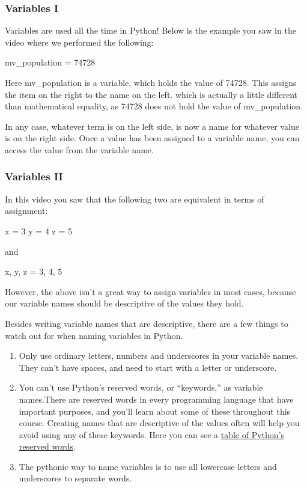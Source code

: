 \documentclass[11pt]{article}
\begin{document}
    \hypertarget{variables-i}{%
\subsubsection{Variables I}\label{variables-i}}

Variables are used all the time in Python! Below is the example you saw
in the video where we performed the following:

mv\_population = 74728

Here mv\_population is a variable, which holds the value of 74728. This
assigns the item on the right to the name on the left. which is actually
a little different than mathematical equality, as 74728 does not hold
the value of mv\_population.

In any case, whatever term is on the left side, is now a name for
whatever value is on the right side. Once a value has been assigned to a
variable name, you can access the value from the variable name.

    \hypertarget{variables-ii}{%
\subsubsection{Variables II}\label{variables-ii}}

In this video you saw that the following two are equivalent in terms of
assignment:

x = 3 y = 4 z = 5

and

x, y, z = 3, 4, 5

However, the above isn't a great way to assign variables in most cases,
because our variable names should be descriptive of the values they
hold.

Besides writing variable names that are descriptive, there are a few
things to watch out for when naming variables in Python.

\begin{enumerate}
\def\labelenumi{\arabic{enumi}.}
\item
  Only use ordinary letters, numbers and underscores in your variable
  names. They can't have spaces, and need to start with a letter or
  underscore.
\item
  You can't use Python's reserved words, or ``keywords,'' as variable
  names.There are reserved words in every programming language that have
  important purposes, and you'll learn about some of these throughout
  this course. Creating names that are descriptive of the values often
  will help you avoid using any of these keywords. Here you can see a
  \href{https://docs.python.org/3/reference/lexical_analysis.html\#keywords}{table
  of Python's reserved words}.
\item
  The pythonic way to name variables is to use all lowercase letters and
  underscores to separate words.
\end{enumerate}
\end{document}

